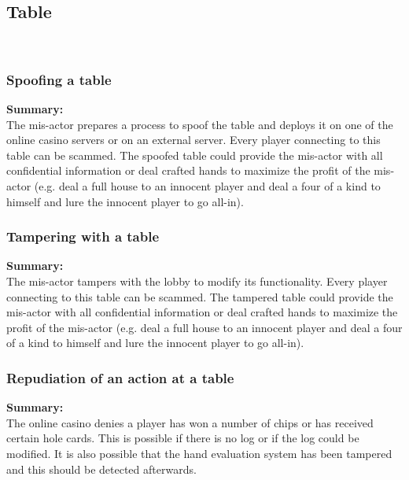 \documentclass[a4paper,11pt]{report}
\begin{document}
\subsection{Table}\
\label{TableCases}
\subsubsection{Spoofing a table}
\label{TableCasesS}
\textbf{Summary:} \\
The mis-actor prepares a process to spoof the table and deploys it on one of the online casino servers or on an external server. Every player connecting to this table can be scammed. The spoofed table could provide the mis-actor with all confidential information or deal crafted hands to maximize the profit of the mis-actor (e.g. deal a full house to an innocent player and deal a four of a kind to himself and lure the innocent player to go all-in).
\subsubsection{Tampering with a table}
\label{TableCasesT}
\textbf{Summary:} \\
The mis-actor tampers with the lobby to modify its functionality. Every player connecting to this table can be scammed. The tampered table could provide the mis-actor with all confidential information or deal crafted hands to maximize the profit of the mis-actor (e.g. deal a full house to an innocent player and deal a four of a kind to himself and lure the innocent player to go all-in).
\subsubsection{Repudiation of an action at a table}
\label{TableCasesR}
\textbf{Summary:} \\
The online casino denies a player has won a number of chips or has received certain hole cards. This is possible if there is no log or if the log could be modified. It is also possible that the hand evaluation system has been tampered and this should be detected afterwards. 
\end{document}
